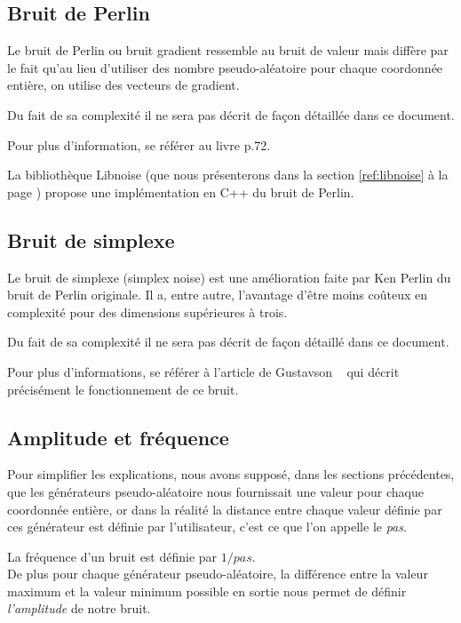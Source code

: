 \subsection{Bruit de Perlin}
Le bruit de Perlin ou bruit gradient ressemble au bruit de valeur mais
diffère par le fait qu'au lieu d'utiliser des nombre pseudo-aléatoire pour chaque
coordonnée entière, on utilise des vecteurs de gradient.

Du fait de sa complexité il ne sera pas décrit de façon détaillée dans ce document.

Pour plus d'information, se référer au livre \cite{Eber02} p.72.

La bibliothèque Libnoise (que nous présenterons dans la section \ref{ref:libnoise} à la page \pageref{ref:libnoise}) propose une implémentation en C++ du bruit de Perlin.

\subsection{Bruit de simplexe}
Le bruit de simplexe (simplex noise) est une amélioration faite par Ken Perlin
du bruit de Perlin originale.
Il a, entre autre, l'avantage d'être moins coûteux en complexité pour des dimensions supérieures à trois.

Du fait de sa complexité il ne sera pas décrit de façon détaillé dans ce document.

Pour plus d'informations, se référer à l'article de Gustavson ~\cite{SimplexNoise}
qui décrit précisément le fonctionnement de ce bruit.

\subsection{Amplitude et fréquence}
Pour simplifier les explications, nous avons supposé, dans les sections précédentes, que les générateurs
pseudo-aléatoire nous fournissait une valeur pour chaque coordonnée entière,
or dans la réalité la distance entre chaque valeur définie par ces générateur
est définie par l'utilisateur, c'est ce que l'on appelle le \emph{pas}.

La fréquence d'un bruit est définie par $1 / pas$.\\

De plus pour chaque générateur pseudo-aléatoire, la différence entre la
valeur maximum et la valeur minimum possible en sortie nous permet de définir
\emph{l'amplitude} de notre bruit.\\

